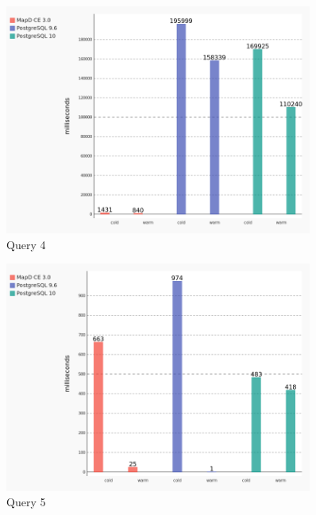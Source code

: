 \begin{figure}[H]
    \centering
    \includegraphics[width=0.9\textwidth,keepaspectratio]{charts/query_4.png}
    \caption{Query 4}
    \label{fig:query_4}
\end{figure}

\begin{figure}[H]
    \centering
    \includegraphics[width=0.9\textwidth,keepaspectratio]{charts/query_5.png}
    \caption{Query 5}
    \label{fig:query_5}
\end{figure}

